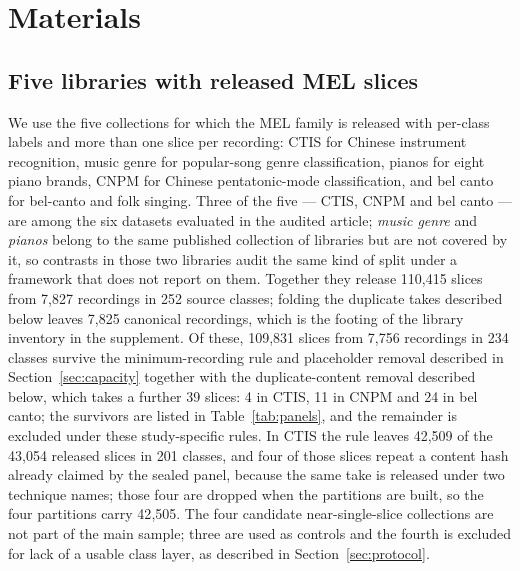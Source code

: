 \section{Materials}\label{sec:materials}

\subsection{Five libraries with released MEL slices}

We use the five collections for which the MEL family is released with per-class labels and more
than one slice per recording: CTIS for Chinese instrument recognition, music genre for
popular-song genre classification, pianos for eight piano brands, CNPM for Chinese pentatonic-mode classification, and
bel canto for bel-canto and folk singing. Three of the five --- CTIS, CNPM and bel canto --- are
among the six datasets evaluated in the audited article; \emph{music genre} and \emph{pianos}
belong to the same published collection of libraries but are not covered by it, so contrasts in
those two libraries audit the same kind of split under a framework that does not report on them.
Together they release 110{,}415 slices from 7{,}827 recordings in
252 source classes; folding the duplicate takes described below leaves 7{,}825 canonical
recordings, which is the footing of the library inventory in the supplement. Of these,
109{,}831 slices from 7{,}756 recordings in 234 classes survive the
minimum-recording rule and placeholder removal described in
Section~\ref{sec:capacity} together with the duplicate-content removal described below, which
takes a further 39 slices: 4 in CTIS, 11 in CNPM and 24 in bel canto; the survivors are listed
in Table~\ref{tab:panels}, and the remainder is excluded under these study-specific rules. In
CTIS the rule leaves 42{,}509 of the 43{,}054 released slices in
201 classes, and four of those slices repeat a content hash already claimed by the sealed panel,
because the same take is released under two technique names; those four are dropped when the
partitions are built, so the four partitions carry 42{,}505. The four candidate near-single-slice collections are not part of the main sample; three are used
as controls and the fourth is excluded for lack of a usable class layer, as described
in Section~\ref{sec:protocol}.

